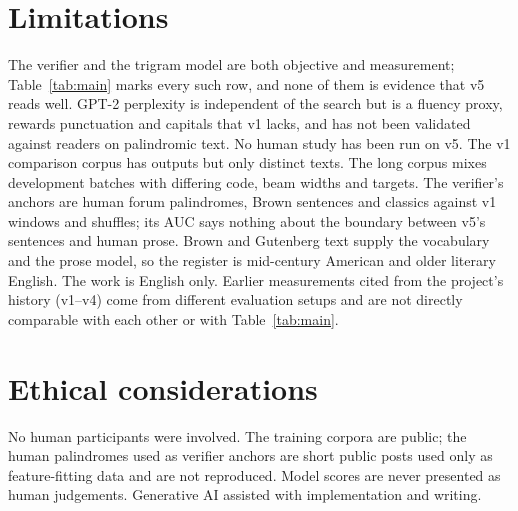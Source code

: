 \documentclass[11pt]{article}
\begin{document}
\section*{Limitations}
The verifier and the trigram model are both objective and measurement; Table~\ref{tab:main} marks every such row, and none of them is evidence that v5 reads well. GPT-2 perplexity is independent of the search but is a fluency proxy, rewards punctuation and capitals that v1 lacks, and has not been validated against readers on palindromic text. No human study has been run on v5. The v1 comparison corpus has \vOneN{} outputs but only \vOneDistinct{} distinct texts. The long corpus mixes development batches with differing code, beam widths and targets. The verifier's anchors are human forum palindromes, Brown sentences and classics against v1 windows and shuffles; its AUC says nothing about the boundary between v5's sentences and human prose. Brown and Gutenberg text supply the vocabulary and the prose model, so the register is mid-century American and older literary English. The work is English only. Earlier measurements cited from the project's history (v1--v4) come from different evaluation setups and are not directly comparable with each other or with Table~\ref{tab:main}.

\section*{Ethical considerations}
No human participants were involved. The training corpora are public; the human palindromes used as verifier anchors are short public posts used only as feature-fitting data and are not reproduced. Model scores are never presented as human judgements. Generative AI assisted with implementation and writing.



\appendix
\end{document}

